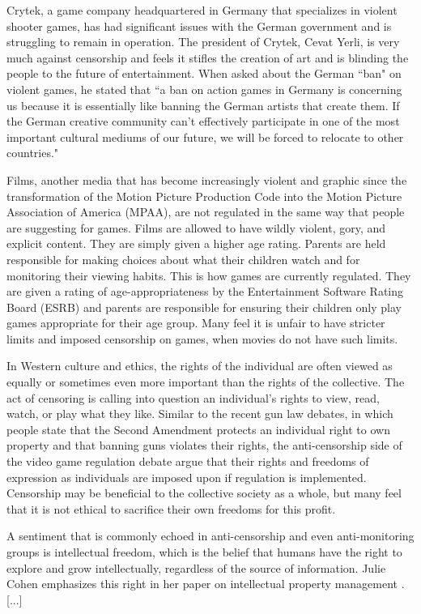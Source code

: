 Crytek, a game company headquartered in Germany that specializes in violent shooter games, has had significant issues with the German government and is struggling to remain in operation. The president of Crytek, Cevat Yerli, is very much against censorship and feels it stifles the creation of art and is blinding the people to the future of entertainment. When asked about the German ``ban" on violent games, he stated that ``a ban on action games in Germany is concerning us because it is essentially like banning the German artists that create them. If the German creative community can't effectively participate in one of the most important cultural mediums of our future, we will be forced to relocate to other countries." \cite{yerli}

Films, another media that has become increasingly violent and graphic since the transformation of the Motion Picture Production Code into the Motion Picture Association of America (MPAA), are not regulated in the same way that people are suggesting for games. Films are allowed to have wildly violent, gory, and explicit content. They are simply given a higher age rating. Parents are held responsible for making choices about what their children watch and for monitoring their viewing habits. This is how games are currently regulated. They are given a rating of age-appropriateness by the Entertainment Software Rating Board (ESRB) and parents are responsible for ensuring their children only play games appropriate for their age group. Many feel it is unfair to have stricter limits and imposed censorship on games, when movies do not have such limits.

In Western culture and ethics, the rights of the individual are often viewed as equally or sometimes even more important than the rights of the collective. The act of censoring is calling into question an individual's rights to view, read, watch, or play what they like. Similar to the recent gun law debates, in which people state that the Second Amendment protects an individual right to own property and that banning guns violates their rights, the anti-censorship side of the video game regulation debate argue that their rights and freedoms of expression as individuals are imposed upon if regulation is implemented. Censorship may be beneficial to the collective society as a whole, but many feel that it is not ethical to sacrifice their own freedoms for this profit. 

A sentiment that is commonly echoed in anti-censorship and even anti-monitoring groups is intellectual freedom, which is the belief that humans have the right to explore and grow intellectually, regardless of the source of information. Julie Cohen emphasizes this right in her paper on intellectual property management \cite{cohen1995}. [...]

